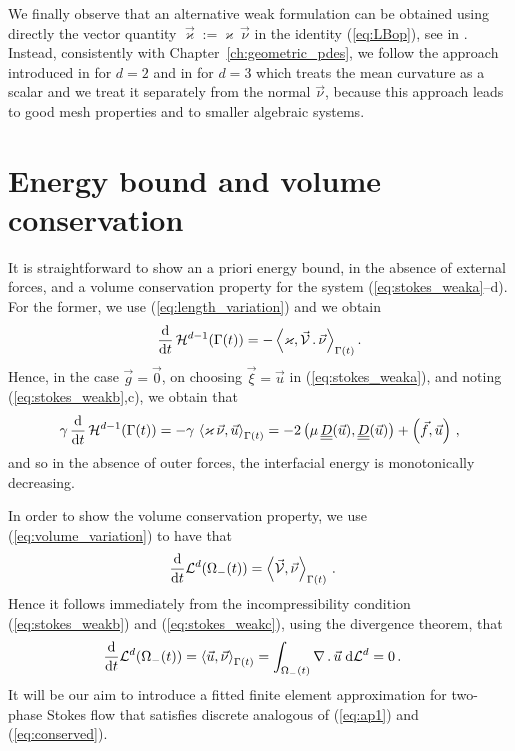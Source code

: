 We finally observe that an alternative weak formulation can be obtained
using directly the vector quantity $\vec\varkappa:=\varkappa\,\vec\nu$
in the identity (\ref{eq:LBop}), see in \cite{Dziuk91,Bansch01,GanesanMT07}.
Instead, consistently with Chapter~\ref{ch:geometric_pdes}, we follow the
approach introduced in \cite{triplej} for $d=2$ and in \cite{gflows3d} for
$d=3$ which treats the mean curvature as a scalar and we treat it
separately from the normal $\vec\nu$, because this approach leads to good mesh
properties and to smaller algebraic systems.

\section{Energy bound and volume conservation}\label{sec:stokes_energy}
It is straightforward to show an a priori energy bound, in the absence of
external forces, and a volume conservation property for the system
(\ref{eq:stokes_weaka}--d). For the former, we use (\ref{eq:length_variation})
and we obtain
\begin{equation}\label{eq:dtarea}
\frac{\rm d}{{\rm d}t}\,\mathcal{H}^{d-1}(\Gamma(t)) = -
\left\langle \varkappa,\vec{\mathcal{V}}\,.\,\vec\nu\right\rangle_{\Gamma(t)}.
\end{equation}
Hence, in the case $\vec g=\vec 0$, on choosing $\vec\xi = \vec u$ in
(\ref{eq:stokes_weaka}), and noting
(\ref{eq:stokes_weakb},c), we obtain that
\begin{align}
\gamma\, \ddt\,\surfvol(\Gamma(t)) = -
\gamma\,\left\langle \varkappa\,\vec\nu, \vec u\right\rangle_{\Gamma(t)}
=  - 2\left(\mu\,\mat D(\vec u), \mat D(\vec u)\right) +
\left(\vec f, \vec u\right) \,,
\label{eq:ap1}
\end{align}
and so in the absence of outer forces, the interfacial energy is monotonically
decreasing.

In order to show the volume conservation property, we use
(\ref{eq:volume_variation}) to have that
\begin{align}
\frac{\rm d}{{\rm d}t} \mathcal{L}^d(\Omega_-(t)) & = \left\langle \vec{\mathcal{V}}, \vec\nu
\right\rangle_{\Gamma(t)}\,.
\end{align}
Hence it follows immediately from the incompressibility condition
(\ref{eq:stokes_weakb}) and (\ref{eq:stokes_weakc}), using the divergence
theorem, that
\begin{align}
\frac{\rm d}{{\rm d}t} \mathcal{L}^d(\Omega_-(t)) & = \left\langle \vec u , \vec\nu
\right\rangle_{\Gamma(t)}
 = \int_{\Omega_-(t)} \nabla\,.\,\vec u \;{\rm d}{\cal L}^{d} =0\,. \label{eq:conserved}
\end{align}
It will be our aim to introduce a fitted finite element approximation for
two-phase Stokes flow that satisfies discrete analogous of
(\ref{eq:ap1}) and (\ref{eq:conserved}).

